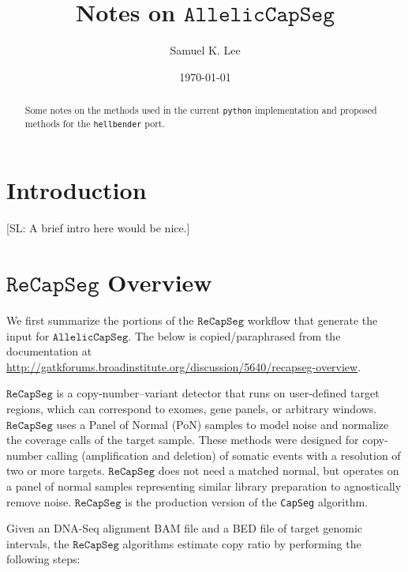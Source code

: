 \documentclass[nofootinbib,amssymb,amsmath]{revtex4}
\newcommand{\RCS}{\texttt{ReCapSeg}}
\newcommand{\ACS}{\texttt{AllelicCapSeg}}
\def\SL#1{{\color [rgb]{0,0,0.8} [SL: #1]}}
\begin{document}
\title{Notes on $\ACS$}
\author{Samuel K. Lee}
\date{\today}

\begin{abstract}
Some notes on the methods used in the current \texttt{python} implementation and proposed methods for the \texttt{hellbender}
port.
\end{abstract}

\maketitle



\section{Introduction}\label{introduction}

\SL{A brief intro here would be nice.}

\section{$\RCS$ Overview} \label{recapseg-overview}

We first summarize the portions of the $\RCS$ workflow that generate the input for $\ACS$.  The below is copied/paraphrased from the documentation at \url{http://gatkforums.broadinstitute.org/discussion/5640/recapseg-overview}.

$\RCS$ is a copy-number--variant detector that runs on user-defined target regions, which can correspond to exomes, gene panels, or arbitrary windows. $\RCS$ uses a Panel of Normal (PoN) samples to model noise and normalize the coverage calls of the target sample. These methods were designed for copy-number calling (amplification and deletion) of somatic events with a resolution of two or more targets. $\RCS$ does not need a matched normal, but operates on a panel of normal samples representing similar library preparation to agnostically remove noise. $\RCS$ is the production version of the \texttt{CapSeg} algorithm.

Given an DNA-Seq alignment BAM file and a BED file of target genomic intervals, the $\RCS$ algorithms estimate copy ratio by performing the following steps:
\end{document}
